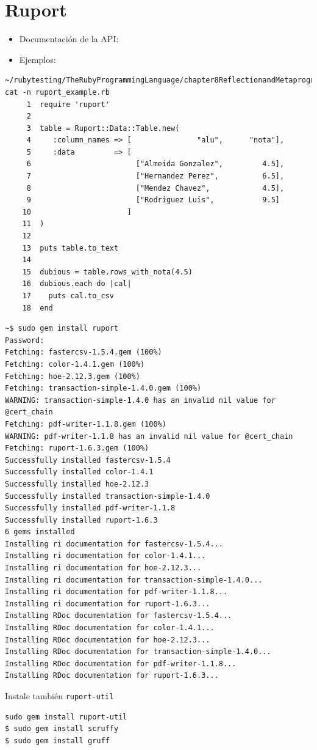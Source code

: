 \section{Ruport}

\begin{itemize}
\item Documentación de la API: 
\item Ejemplos: 
\end{itemize}

\begin{verbatim}
~/rubytesting/TheRubyProgrammingLanguage/chapter8ReflectionandMetaprogramming$ cat -n ruport_example.rb 
     1  require 'ruport'
     2  
     3  table = Ruport::Data::Table.new(
     4     :column_names => [               "alu",      "nota"],
     5     :data         => [ 
     6                        ["Almeida Gonzalez",         4.5],
     7                        ["Hernandez Perez",          6.5],
     8                        ["Mendez Chavez",            4.5],
     9                        ["Rodriguez Luis",           9.5]
    10                      ]
    11  )
    12  
    13  puts table.to_text
    14  
    15  dubious = table.rows_with_nota(4.5)
    16  dubious.each do |cal|
    17    puts cal.to_csv
    18  end

\end{verbatim}

\begin{verbatim}
~$ sudo gem install ruport
Password:
Fetching: fastercsv-1.5.4.gem (100%)
Fetching: color-1.4.1.gem (100%)
Fetching: hoe-2.12.3.gem (100%)
Fetching: transaction-simple-1.4.0.gem (100%)
WARNING: transaction-simple-1.4.0 has an invalid nil value for @cert_chain
Fetching: pdf-writer-1.1.8.gem (100%)
WARNING: pdf-writer-1.1.8 has an invalid nil value for @cert_chain
Fetching: ruport-1.6.3.gem (100%)
Successfully installed fastercsv-1.5.4
Successfully installed color-1.4.1
Successfully installed hoe-2.12.3
Successfully installed transaction-simple-1.4.0
Successfully installed pdf-writer-1.1.8
Successfully installed ruport-1.6.3
6 gems installed
Installing ri documentation for fastercsv-1.5.4...
Installing ri documentation for color-1.4.1...
Installing ri documentation for hoe-2.12.3...
Installing ri documentation for transaction-simple-1.4.0...
Installing ri documentation for pdf-writer-1.1.8...
Installing ri documentation for ruport-1.6.3...
Installing RDoc documentation for fastercsv-1.5.4...
Installing RDoc documentation for color-1.4.1...
Installing RDoc documentation for hoe-2.12.3...
Installing RDoc documentation for transaction-simple-1.4.0...
Installing RDoc documentation for pdf-writer-1.1.8...
Installing RDoc documentation for ruport-1.6.3...
\end{verbatim}
Instale también \verb|ruport-util|
\begin{verbatim}
sudo gem install ruport-util 
$ sudo gem install scruffy
$ sudo gem install gruff
\end{verbatim}

